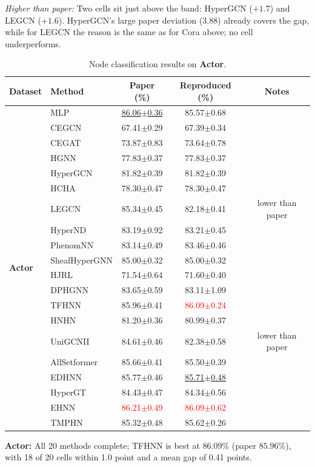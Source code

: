 \documentclass[11pt,a4paper]{article}
\begin{document}
\noindent\textit{Higher than paper:} Two cells sit just above the band: HyperGCN ($+1.7$) and LEGCN ($+1.6$). HyperGCN's large paper deviation ($3.88$) already covers the gap, while for LEGCN the reason is the same as for Cora above; no cell underperforms.

\begin{table}[H]
	\centering\small
	\begin{tabular}{llccc}
		\toprule
		Dataset & Method & Paper (\%) & Reproduced (\%) & Notes \\
		\midrule
		\multirow{20}{*}{\textbf{Actor}} & MLP               & \underline{86.06$\pm$0.36}   & 85.57$\pm$0.68   &  \\
		 & CEGCN             & 67.41$\pm$0.29   & 67.39$\pm$0.34   &  \\
		 & CEGAT             & 73.87$\pm$0.83   & 73.64$\pm$0.78   &  \\
		 & HGNN              & 77.83$\pm$0.37   & 77.83$\pm$0.37   &  \\
		 & HyperGCN          & 81.82$\pm$0.39   & 81.82$\pm$0.39   &  \\
		 & HCHA              & 78.30$\pm$0.47   & 78.30$\pm$0.47   &  \\
		 & LEGCN             & 85.34$\pm$0.45   & 82.18$\pm$0.41   & lower than paper \\
		 & HyperND           & 83.19$\pm$0.92   & 83.21$\pm$0.45   &  \\
		 & PhenomNN          & 83.14$\pm$0.49   & 83.46$\pm$0.46   &  \\
		 & SheafHyperGNN     & 85.00$\pm$0.32   & 85.00$\pm$0.32   &  \\
		 & HJRL              & 71.54$\pm$0.64   & 71.60$\pm$0.40   &  \\
		 & DPHGNN            & 83.65$\pm$0.59   & 83.11$\pm$1.09   &  \\
		 & TFHNN             & 85.96$\pm$0.41   & \textcolor{red}{86.09$\pm$0.24}   &  \\
		 & HNHN              & 81.20$\pm$0.36   & 80.99$\pm$0.37   &  \\
		 & UniGCNII          & 84.61$\pm$0.46   & 82.38$\pm$0.58   & lower than paper \\
		 & AllSetformer      & 85.66$\pm$0.41   & 85.50$\pm$0.39   &  \\
		 & EDHNN             & 85.77$\pm$0.46   & \underline{85.71$\pm$0.48}   &  \\
		 & HyperGT           & 84.43$\pm$0.47   & 84.34$\pm$0.56   &  \\
		 & EHNN              & \textcolor{red}{86.21$\pm$0.49}   & \textcolor{red}{86.09$\pm$0.62}   &  \\
		 & TMPHN             & 85.32$\pm$0.48   & 85.62$\pm$0.26   &  \\
		\bottomrule
	\end{tabular}
	\caption{Node classification results on \textbf{Actor}.}
\end{table}
\par\smallskip
\noindent\textbf{Actor:} All 20 methods complete; TFHNN is best at $86.09\%$ (paper $85.96\%$), with 18 of 20 cells within 1.0 point and a mean gap of 0.41 points.
\end{document}
